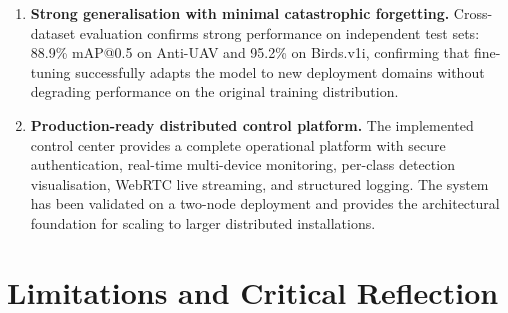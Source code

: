 \documentclass[12pt,a4paper]{report}
\begin{document}
\begin{enumerate}
  \item \textbf{Strong generalisation with minimal catastrophic forgetting.}
        Cross-dataset evaluation confirms strong performance on independent test sets:
        88.9\% mAP@0.5 on Anti-UAV and 95.2\% on Birds.v1i,
        confirming that fine-tuning successfully adapts the model to new deployment
        domains without degrading performance on the original training distribution.
  
  \item \textbf{Production-ready distributed control platform.}
        The implemented control center provides a complete operational platform with
        secure authentication, real-time multi-device monitoring, per-class detection
        visualisation, WebRTC live streaming, and structured logging. The system has
        been validated on a two-node deployment and provides the architectural foundation
        for scaling to larger distributed installations.
\end{enumerate}

\section{Limitations and Critical Reflection}
\end{document}
